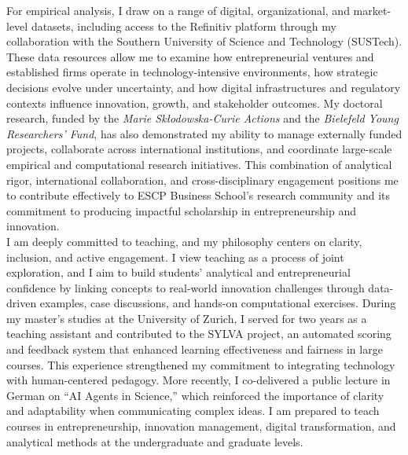 \documentclass{nfr}
\begin{document}
For empirical analysis, I draw on a range of digital, organizational, and market-level datasets, including access to the Refinitiv platform through my collaboration with the Southern University of Science and Technology (SUSTech). 
These data resources allow me to examine how entrepreneurial ventures and established firms operate in technology-intensive environments, how strategic decisions evolve under uncertainty, and how digital infrastructures and regulatory contexts influence innovation, growth, and stakeholder outcomes. 
My doctoral research, funded by the \textit{Marie Skłodowska-Curie Actions} and the \textit{Bielefeld Young Researchers’ Fund}, has also demonstrated my ability to manage externally funded projects, collaborate across international institutions, and coordinate large-scale empirical and computational research initiatives. 
This combination of analytical rigor, international collaboration, and cross-disciplinary engagement positions me to contribute effectively to ESCP Business School’s research community and its commitment to producing impactful scholarship in entrepreneurship and innovation.\\

I am deeply committed to teaching, and my philosophy centers on clarity, inclusion, and active engagement. 
I view teaching as a process of joint exploration, and I aim to build students’ analytical and entrepreneurial confidence by linking concepts to real-world innovation challenges through data-driven examples, case discussions, and hands-on computational exercises. 
During my master’s studies at the University of Zurich, I served for two years as a teaching assistant and contributed to the SYLVA project, an automated scoring and feedback system that enhanced learning effectiveness and fairness in large courses. 
This experience strengthened my commitment to integrating technology with human-centered pedagogy. 
More recently, I co-delivered a public lecture in German on “AI Agents in Science,” which reinforced the importance of clarity and adaptability when communicating complex ideas. 
I am prepared to teach courses in entrepreneurship, innovation management, digital transformation, and analytical methods at the undergraduate and graduate levels.\\ 
\end{document}
